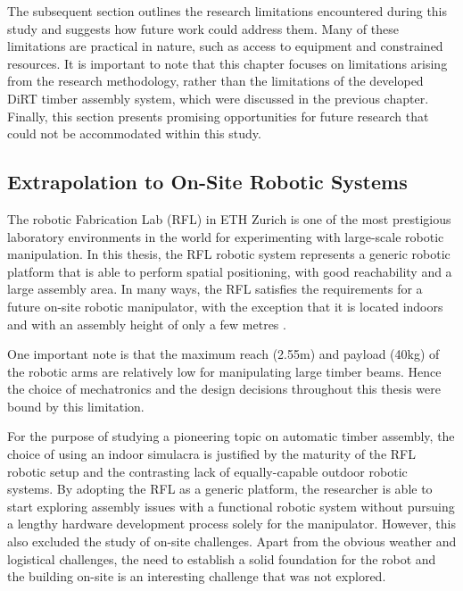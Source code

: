 The subsequent section outlines the research limitations encountered during this study and suggests how future work could address them. Many of these limitations are practical in nature, such as access to equipment and constrained resources. It is important to note that this chapter focuses on limitations arising from the research methodology, rather than the limitations of the developed DiRT timber assembly system, which were discussed in the previous chapter. Finally, this section presents promising opportunities for future research that could not be accommodated within this study.

\subsection{Extrapolation to On-Site Robotic Systems}
\label{subsection:extrapolation-to-on-site-robots}

The robotic Fabrication Lab (RFL) in ETH Zurich is one of the most prestigious laboratory environments in the world for experimenting with large-scale robotic manipulation. In this thesis, the RFL robotic system represents a generic robotic platform that is able to perform spatial positioning, with good reachability and a large assembly area. In many ways, the RFL satisfies the requirements for a future on-site robotic manipulator, with the exception that it is located indoors and with an assembly height of only a few metres .

One important note is that the maximum reach (2.55m) and payload (40kg) of the robotic arms are relatively low for manipulating large timber beams. Hence the choice of mechatronics and the design decisions throughout this thesis were bound by this limitation. 

For the purpose of studying a pioneering topic on automatic timber assembly, the choice of using an indoor simulacra is justified by the maturity of the RFL robotic setup and the contrasting lack of equally-capable outdoor robotic systems. By adopting the RFL as a generic platform, the researcher is able to start exploring assembly issues with a functional robotic system without pursuing a lengthy hardware development process solely for the manipulator. However, this also excluded the study of on-site challenges. Apart from the obvious weather and logistical challenges, the need to establish a solid foundation for the robot and the building on-site is an interesting challenge that was not explored. 

